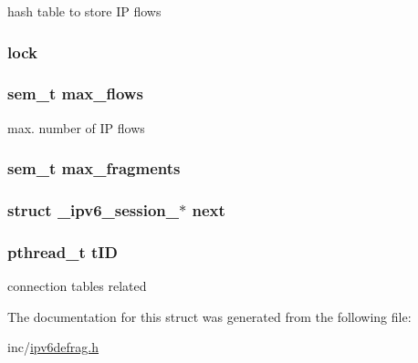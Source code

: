 hash table to store I\-P flows 

\hypertarget{struct__ipv6__session___aad15823e4f2835531e6a02321cd53f7e}{
\subsubsection[{lock}]{ lock}}\label{struct__ipv6__session___aad15823e4f2835531e6a02321cd53f7e}
\hypertarget{struct__ipv6__session___aba31d11fb16b2f989c42f6433365649e}{
\subsubsection[{max\-\_\-flows}]{\setlength{\rightskip}{0pt plus 5cm}sem\-\_\-t max\-\_\-flows}}\label{struct__ipv6__session___aba31d11fb16b2f989c42f6433365649e}


max. number of I\-P flows 

\hypertarget{struct__ipv6__session___a122dd84b8082b78785803252948a6ad0}{
\subsubsection[{max\-\_\-fragments}]{\setlength{\rightskip}{0pt plus 5cm}sem\-\_\-t max\-\_\-fragments}}\label{struct__ipv6__session___a122dd84b8082b78785803252948a6ad0}
\hypertarget{struct__ipv6__session___ac6d0686c91caf00b0b9eaefd9ec5bfcd}{
\subsubsection[{next}]{\setlength{\rightskip}{0pt plus 5cm}struct {\bf \-\_\-ipv6\-\_\-session\-\_\-}$\ast$ next}}\label{struct__ipv6__session___ac6d0686c91caf00b0b9eaefd9ec5bfcd}
\hypertarget{struct__ipv6__session___ab10186c154259d2b4ed2d25b7e23ed17}{
\subsubsection[{t\-I\-D}]{\setlength{\rightskip}{0pt plus 5cm}pthread\-\_\-t t\-I\-D}}\label{struct__ipv6__session___ab10186c154259d2b4ed2d25b7e23ed17}


connection tables related 



The documentation for this struct was generated from the following file\-:\begin{DoxyCompactItemize}
\item 
inc/\hyperlink{ipv6defrag_8h}{ipv6defrag.\-h}\end{DoxyCompactItemize}
